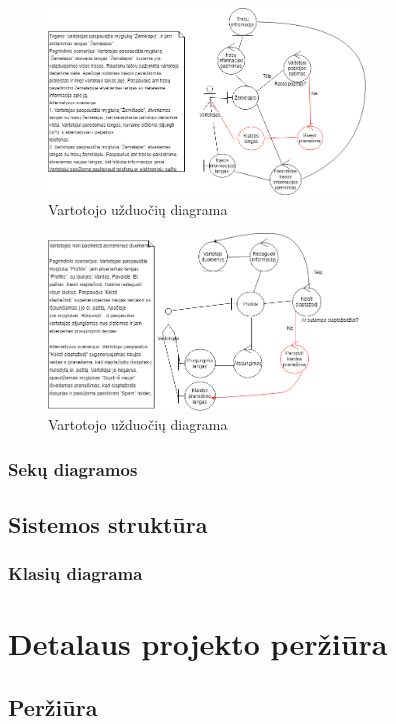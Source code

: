 \documentclass[oneside]{VUMIFPSkursinis}
\begin{document}
			\begin{figure}[h]
    				\centering
    				\includegraphics[width=0.75\textwidth]{rob13.png}
    				\caption{Vartotojo užduočių diagrama}
    				\label{fig:VartotojoUseCasel}
			\end{figure}

			\begin{figure}[h]
    				\centering
    				\includegraphics[width=0.75\textwidth]{rob14.png}
    				\caption{Vartotojo užduočių diagrama}
    				\label{fig:VartotojoUseCasel}
			\end{figure}


		\subsubsection{Sekų diagramos}
	\subsection{Sistemos struktūra}
		\subsubsection{Klasių diagrama}
	

\section{Detalaus projekto peržiūra}
	\subsection{Peržiūra}
\end{document}
